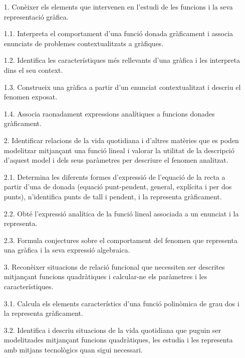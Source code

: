 {\begin{enumerate}
	\item[1.] Conèixer els elements que intervenen en l’estudi de les funcions i la seva representació gràfica.
\item[1.1.] Interpreta el comportament d’una funció donada gràficament i associa 
enunciats de problemes contextualitzats a gràfiques.
\item[1.2.] Identifica les característiques més rellevants d’una gràfica i les interpreta dins el seu context.
\item[1.3.] Construeix una gràfica a partir d’un enunciat contextualitzat i descriu el fenomen exposat.
\item[1.4.] Associa raonadament expressions analítiques a funcions donades gràficament.
\item[2.] Identificar relacions de la vida quotidiana i d’altres matèries que es poden modelitzar mitjançant una funció lineal i valorar la utilitat de la descripció d’aquest model i dels seus paràmetres per descriure el fenomen analitzat.
\item[2.1.] Determina les diferents formes d’expressió de l’equació de la recta a partir d’una de donada (equació punt-pendent, general, explícita i per dos punts), n’identifica punts de tall i pendent, i la representa gràficament.
\item[2.2.] Obté l’expressió analítica de la funció lineal associada a un enunciat i la representa.
\item[2.3.] Formula conjectures sobre el comportament del fenomen que representa una gràfica i la seva expressió algebraica.
\item[3.] Reconèixer situacions de relació funcional que necessiten ser descrites mitjançant funcions quadràtiques i calcular-ne els paràmetres i les característiques.
\item[3.1.] Calcula els elements característics d’una funció polinòmica de grau dos i la representa gràficament.
\item[3.2.] Identifica i descriu situacions de la vida quotidiana que puguin ser modelitzades mitjançant funcions quadràtiques, les estudia i les representa amb mitjans tecnològics quan sigui necessari.
\end{enumerate}
 
}


